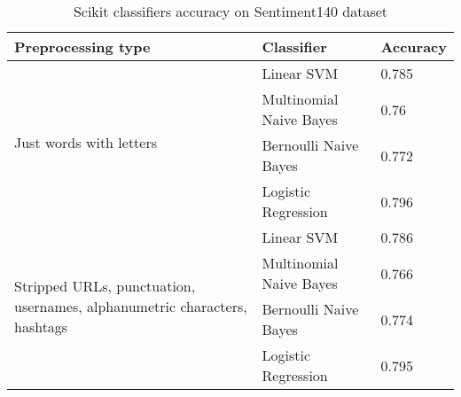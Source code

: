 \begin{table}[H]
\centering
\begin{tabular}{|p{5cm}|p{4.5cm}|p{2cm}|}
 \hline
\textbf{Preprocessing type} & \textbf{ Classifier }& \textbf{Accuracy}\\
 \hline
 \multirow{4}{*}{\parbox{5cm}{\centering Just words with letters}} & Linear SVM   & 0.785\\ 
   &  Multinomial Naive Bayes & 0.76\\ 
   &  Bernoulli Naive Bayes & 0.772\\  
   & Logistic Regression & 0.796\\ \hline 
  \multirow{4}{*}{\parbox{5cm}{\centering Stripped URLs, punctuation, usernames, alphanumetric characters, hashtags}} & Linear SVM   & 0.786\\ 
   &  Multinomial Naive Bayes & 0.766\\ 
   &  Bernoulli Naive Bayes & 0.774\\  
   & Logistic Regression & 0.795\\ \hline 
\end{tabular}
\caption{Scikit classifiers accuracy on Sentiment140 dataset}
\label{table:preprocesingAccuracy}
\end{table}


